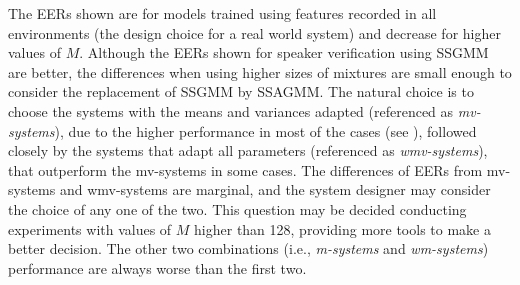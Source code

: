 

The EERs shown are for models trained using features recorded in all environments (the design choice for a real world system) and decrease for higher values of $M$. Although the EERs shown for speaker verification using SSGMM are better, the differences when using higher sizes of mixtures are small enough to consider the replacement of SSGMM by SSAGMM. The natural choice is to choose the systems with the means and variances adapted (referenced as \emph{mv-systems}), due to the higher performance in most of the cases (see ), followed closely by the systems that adapt all parameters (referenced as \emph{wmv-systems}), that outperform the mv-systems in some cases. The differences of EERs from mv-systems and wmv-systems are marginal, and the system designer may consider the choice of any one of the two. This question may be decided conducting experiments with values of $M$ higher than 128, providing more tools to make a better decision. The other two combinations (i.e., \emph{m-systems} and \emph{wm-systems}) performance are always worse than the first two.